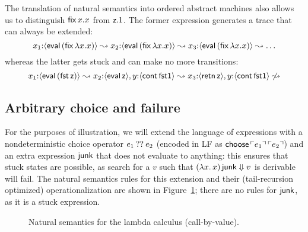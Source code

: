 The translation of natural semantics into ordered abstract machines
also allows us to distinguish ${\sf fix}\,x.x$ from ${\sf z}.1$.
The former expression generates a trace that can always be extended:
\[ x_1{:}\langle {{\sf eval}\,({\sf fix}\,\lambda x.x)} \rangle \leadsto
   x_2{:}\langle {{\sf eval}\,({\sf fix}\,\lambda x.x)} \rangle \leadsto
   x_3{:}\langle {{\sf eval}\,({\sf fix}\,\lambda x.x)} \rangle \leadsto \ldots 
\]whereas the latter gets stuck and can make no more transitions:\[ 
  x_1{:}\langle {{\sf eval}\,({\sf fst}\,{\sf z})} \rangle \leadsto
  x_2{:}\langle {{\sf eval}\,{\sf z}} \rangle, y{:}\langle {{\sf cont}\,{\sf fst1}} \rangle \leadsto
  x_3{:}\langle {{\sf retn}\,{\sf z}} \rangle, y{:}\langle {{\sf cont}\,{\sf fst1}} \rangle 
  \not\leadsto
\]

\subsection{Arbitrary choice and failure}

For the purposes of illustration, we will extend the language of
expressions with a nondeterministic choice operator $e_1 \mathbin{??} e_2$
(encoded in LF as ${\sf choose}\,{\ulcorner{e_1}\urcorner}\,{\ulcorner{e_2}\urcorner}$) and an
extra expression ${\sf junk}$ that does not evaluate to anything: this
ensures that stuck states are possible, as search for a $v$ such that
$(\lambda x.\,x)\,{\sf junk} \Downarrow v$ is derivable will fail.
The natural semantics rules for this extension and their
(tail-recursion optimized) operationalization are shown in
Figure~\ref{fig:ns-arb}; there are no rules for ${\sf junk}$, as it is
a stuck expression.

\begin{figure}[t]
\begin{minipage}[b]{0.45\linewidth}
\end{minipage}
\hspace{0.5cm}
\begin{minipage}[b]{0.55\linewidth}
\end{minipage}
\caption{Natural semantics for the lambda calculus (call-by-value).}
\label{fig:ns-arb}
\end{figure}

